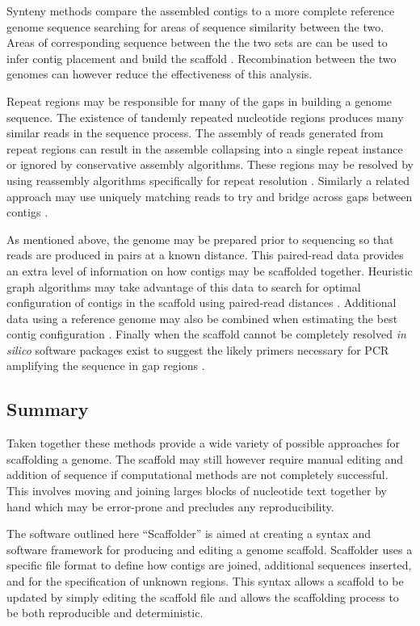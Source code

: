 \documentclass[10pt]{bmc_article}
\newenvironment{bmcformat}{\begin{raggedright}\baselineskip20pt\sloppy\setboolean{publ}{false}}{\end{raggedright}\baselineskip20pt\sloppy}
\begin{document}
\begin{bmcformat}
Synteny methods compare the assembled contigs to a more complete reference
genome sequence searching for areas of sequence similarity between the two.
Areas of corresponding sequence between the the two sets are can be used to
infer contig placement and build the scaffold \cite{richter2007,zhao2008}.
Recombination between the two genomes can however reduce the effectiveness of
this analysis. \pb

Repeat regions may be responsible for many of the gaps in building a genome
sequence. The existence of tandemly repeated nucleotide regions produces many
similar reads in the sequence process. The assembly of reads generated from
repeat regions can result in the assemble collapsing into a single repeat
instance or ignored by conservative assembly algorithms. These regions may be
resolved by using reassembly algorithms specifically for repeat resolution
\cite{mulyukov2002,koren2010}. Similarly a related approach may use uniquely
matching reads to try and bridge across gaps between contigs \cite{tsai2010}.
\pb

As mentioned above, the genome may be prepared prior to sequencing so that
reads are produced in pairs at a known distance. This paired-read data
provides an extra level of information on how contigs may be scaffolded
together. Heuristic graph algorithms may take advantage of this data to search
for optimal configuration of contigs in the scaffold using paired-read distances
\cite{dayarian2010}. Additional data using a reference genome may also be
combined when estimating the best contig configuration \cite{pop2004}. Finally
when the scaffold cannot be completely resolved \emph{in silico} software
packages exist to suggest the likely primers necessary for PCR amplifying the
sequence in gap regions \cite{gordon2001,nagarajan2010}. \pb

\subsection*{Summary} %

Taken together these methods provide a wide variety of possible approaches for
scaffolding a genome. The scaffold may still however require manual editing and
addition of sequence if computational methods are not completely successful.
This involves moving and joining larges blocks of nucleotide text together by
hand which may be error-prone and precludes any reproducibility.
\pb

The software outlined here ``Scaffolder'' is aimed at creating a syntax and
software framework for producing and editing a genome scaffold. Scaffolder uses
a specific file format to define how contigs are joined, additional sequences
inserted, and for the specification of unknown regions. This syntax allows
a scaffold to be updated by simply editing the scaffold file and allows the
scaffolding process to be both reproducible and deterministic. \pb


\end{bmcformat}
\end{document}
